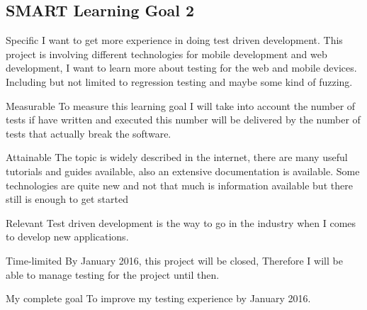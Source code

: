 \documentclass[12pt]{article}
\begin{document}
\subsection{SMART Learning Goal 2}
\begin{SMART}
    \item[Specific] I want to get more experience in doing test driven development. This project is involving different technologies for mobile development and web development, I want to learn more about testing for the web and mobile devices. Including but not limited to regression testing and maybe some kind of fuzzing.
    \item[Measurable] To measure this learning goal I will take into account the number of tests if have written and executed this number will be delivered by the number of tests that actually break the software.
    \item[Attainable] The topic is widely described in the internet, there are many useful tutorials and guides available, also an extensive documentation is available. Some technologies are quite new and not that much is information available but there still is enough to get started
    \item[Relevant] Test driven development is the way to go in the industry when I comes to develop new applications.
    \item[Time-limited] By January 2016, this project will be closed, Therefore I will be able to manage testing for the project until then.
    \item[My complete goal] To improve my testing  experience by January 2016.
\end{SMART}
\end{document}
